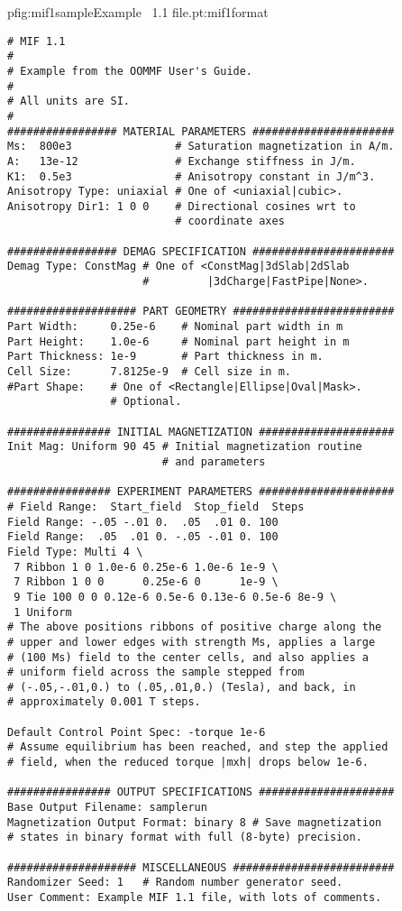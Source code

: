 \begin{codelisting}{p}{fig:mif1sample}{Example \MIF~1.1 file.}{pt:mif1format}
\begin{verbatim}
# MIF 1.1
#
# Example from the OOMMF User's Guide.
#
# All units are SI.
#
################# MATERIAL PARAMETERS ######################
Ms:  800e3                # Saturation magnetization in A/m.
A:   13e-12               # Exchange stiffness in J/m.
K1:  0.5e3                # Anisotropy constant in J/m^3.
Anisotropy Type: uniaxial # One of <uniaxial|cubic>.
Anisotropy Dir1: 1 0 0    # Directional cosines wrt to
                          # coordinate axes

################# DEMAG SPECIFICATION ######################
Demag Type: ConstMag # One of <ConstMag|3dSlab|2dSlab
                     #         |3dCharge|FastPipe|None>.

#################### PART GEOMETRY #########################
Part Width:     0.25e-6    # Nominal part width in m
Part Height:    1.0e-6     # Nominal part height in m
Part Thickness: 1e-9       # Part thickness in m.
Cell Size:      7.8125e-9  # Cell size in m.
#Part Shape:    # One of <Rectangle|Ellipse|Oval|Mask>.
                # Optional.

################ INITIAL MAGNETIZATION #####################
Init Mag: Uniform 90 45 # Initial magnetization routine
                        # and parameters

################ EXPERIMENT PARAMETERS #####################
# Field Range:  Start_field  Stop_field  Steps
Field Range: -.05 -.01 0.  .05  .01 0. 100
Field Range:  .05  .01 0. -.05 -.01 0. 100
Field Type: Multi 4 \
 7 Ribbon 1 0 1.0e-6 0.25e-6 1.0e-6 1e-9 \
 7 Ribbon 1 0 0      0.25e-6 0      1e-9 \
 9 Tie 100 0 0 0.12e-6 0.5e-6 0.13e-6 0.5e-6 8e-9 \
 1 Uniform
# The above positions ribbons of positive charge along the
# upper and lower edges with strength Ms, applies a large
# (100 Ms) field to the center cells, and also applies a
# uniform field across the sample stepped from
# (-.05,-.01,0.) to (.05,.01,0.) (Tesla), and back, in
# approximately 0.001 T steps.

Default Control Point Spec: -torque 1e-6
# Assume equilibrium has been reached, and step the applied
# field, when the reduced torque |mxh| drops below 1e-6.

################ OUTPUT SPECIFICATIONS #####################
Base Output Filename: samplerun
Magnetization Output Format: binary 8 # Save magnetization
# states in binary format with full (8-byte) precision.

#################### MISCELLANEOUS #########################
Randomizer Seed: 1   # Random number generator seed.
User Comment: Example MIF 1.1 file, with lots of comments.
\end{verbatim}
\end{codelisting}

